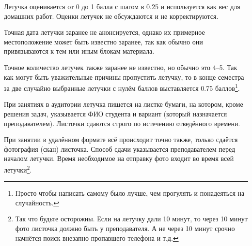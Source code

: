 Летучка оценивается от 0 до 1 балла с шагом в 0.25 и используется как вес для домашних работ. Оценки летучек не обсуждаются и не корректируются. 

Точная дата летучки заранее не анонсируется, однако их примерное местоположение может быть известно заранее, так как обычно они привязываются к тем или иным блокам материала.

Точное количество летучек также заранее не известно, но обычно это 4--5. Так как могут быть уважительные причины пропустить летучку, то в конце семестра за две случайно выбранные летучки с нулём баллов выставляется 0.75 баллов\footnote{Просто чтобы написать самому было лучше, чем прогулять и понадеяться на случайность.}. 

При занятиях в аудитории летучка пишется на листке бумаги, на котором, кроме решения задач, указывается ФИО студента и вариант (который назначается преподавателем). Листочки сдаются строго по истечению отведённого времени.

При занятии в удалённом формате всё происходит точно также, только сдаётся фотография (скан) листочка. Способ сдачи указывается преподавателем перед началом летучки. Время необходимое на отправку фото входит во время всей летучки\footnote{Так что будьте осторожны. Если на летучку дали 10 минут, то через 10 минут фото листочка должно быть у преподавателя. А не через 10 минут срочно начнётся поиск внезапно пропавшего телефона и т.д.}.